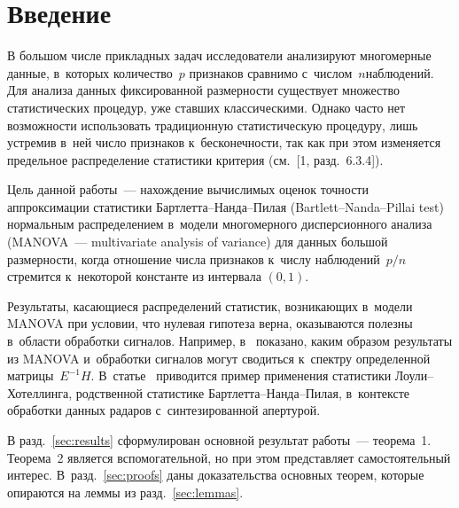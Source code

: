 

\vspace*{-2pt}


\thispagestyle{headings}

\begin{multicols}{2}

\label{st\stat}




\section{Введение}
\label{sec:intro}

В большом числе прикладных задач исследователи анализируют многомерные данные, 
в~которых количество~$p$ признаков сравнимо с~числом~$n$\linebreak наблюдений. Для анализа 
данных фиксированной размерности существует множество статистических процедур, 
уже ставших классическими.\linebreak
Однако час\-то нет возможности использовать традиционную статистическую процедуру, 
лишь устремив в~ней чис\-ло признаков к~бесконечности,
так как при этом изменяется предельное распределение статистики критерия  (см.~[1,  
разд.~6.3.4]).

Цель данной работы~--- нахождение вычислимых оценок точности аппроксимации 
статистики Барт\-лет\-та--Нан\-да--Пи\-лая (Bartlett--Nanda--Pillai test) нормальным 
распределением в~модели многомерного дисперсионного анализа (MANOVA~--- multivariate analysis of variance) 
для данных 
большой размерности,
когда отношение числа \mbox{признаков} к~чис\-лу  наблюдений~$p/n$ стремится к~некоторой 
константе из интервала $(0, 1)$.

Результаты, касающиеся распределений статистик, возникающих в~модели MANOVA при 
условии, что нулевая гипотеза верна, оказываются полезны в~области обработки 
сигналов. \mbox{Например}, в~\cite{lit:Johnstone_RoyStat} показано, каким образом 
результаты из MANOVA и~обработки сигналов могут сводиться к~спектру определенной 
матрицы~$E^{-1}H$. В~\mbox{статье}~\cite{lit:Akbari_AppliedLH} приводится пример 
применения статистики Лоу\-ли--Хо\-тел\-лин\-га, родственной статистике 
Барт\-лет\-та--Нан\-да--Пи\-лая, в~контексте обработки данных радаров с~синтезированной апертурой.

В разд.~\ref{sec:results} сформулирован основной результат работы~--- 
теорема~1.
Теорема~2 является   вспомогательной, но при этом 
представляет самостоятельный интерес.
В~разд.~\ref{sec:proofs} даны доказательства основных теорем, которые 
опираются на леммы из разд.~\ref{sec:lemmas}.


\end{multicols}
